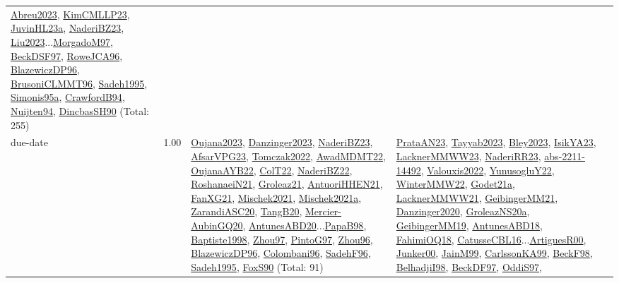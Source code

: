 {\begin{longtable}{p{3cm}r>{\raggedright\arraybackslash}p{6cm}>{\raggedright\arraybackslash}p{6cm}>{\raggedright\arraybackslash}p{8cm}}
\hyperref[detail:Abreu2023]{Abreu2023}, \hyperref[detail:KimCMLLP23]{KimCMLLP23}, \hyperref[detail:JuvinHL23a]{JuvinHL23a}, \hyperref[detail:NaderiBZ23]{NaderiBZ23}, \hyperref[detail:Liu2023]{Liu2023}...\hyperref[detail:MorgadoM97]{MorgadoM97}, \hyperref[detail:BeckDSF97]{BeckDSF97}, \hyperref[detail:RoweJCA96]{RoweJCA96}, \hyperref[detail:BlazewiczDP96]{BlazewiczDP96}, \hyperref[detail:BrusoniCLMMT96]{BrusoniCLMMT96}, \hyperref[detail:Sadeh1995]{Sadeh1995}, \hyperref[detail:Simonis95a]{Simonis95a}, \hyperref[detail:CrawfordB94]{CrawfordB94}, \hyperref[detail:Nuijten94]{Nuijten94}, \hyperref[detail:DincbasSH90]{DincbasSH90} (Total: 255)\\
\index{due-date}\index{Concepts!due-date}due-date &  1.00 & \hyperref[detail:Oujana2023]{Oujana2023}, \hyperref[detail:Danzinger2023]{Danzinger2023}, \hyperref[detail:NaderiBZ23]{NaderiBZ23}, \hyperref[detail:AfsarVPG23]{AfsarVPG23}, \hyperref[detail:Tomczak2022]{Tomczak2022}, \hyperref[detail:AwadMDMT22]{AwadMDMT22}, \hyperref[detail:OujanaAYB22]{OujanaAYB22}, \hyperref[detail:ColT22]{ColT22}, \hyperref[detail:NaderiBZ22]{NaderiBZ22}, \hyperref[detail:RoshanaeiN21]{RoshanaeiN21}, \hyperref[detail:Groleaz21]{Groleaz21}, \hyperref[detail:AntuoriHHEN21]{AntuoriHHEN21}, \hyperref[detail:FanXG21]{FanXG21}, \hyperref[detail:Mischek2021]{Mischek2021}, \hyperref[detail:Mischek2021a]{Mischek2021a}, \hyperref[detail:ZarandiASC20]{ZarandiASC20}, \hyperref[detail:TangB20]{TangB20}, \hyperref[detail:Mercier-AubinGQ20]{Mercier-AubinGQ20}, \hyperref[detail:AntunesABD20]{AntunesABD20}...\hyperref[detail:PapaB98]{PapaB98}, \hyperref[detail:Baptiste1998]{Baptiste1998}, \hyperref[detail:Zhou97]{Zhou97}, \hyperref[detail:PintoG97]{PintoG97}, \hyperref[detail:Zhou96]{Zhou96}, \hyperref[detail:BlazewiczDP96]{BlazewiczDP96}, \hyperref[detail:Colombani96]{Colombani96}, \hyperref[detail:SadehF96]{SadehF96}, \hyperref[detail:Sadeh1995]{Sadeh1995}, \hyperref[detail:FoxS90]{FoxS90} (Total: 91) & \hyperref[detail:PrataAN23]{PrataAN23}, \hyperref[detail:Tayyab2023]{Tayyab2023}, \hyperref[detail:Bley2023]{Bley2023}, \hyperref[detail:IsikYA23]{IsikYA23}, \hyperref[detail:LacknerMMWW23]{LacknerMMWW23}, \hyperref[detail:NaderiRR23]{NaderiRR23}, \hyperref[detail:abs-2211-14492]{abs-2211-14492}, \hyperref[detail:Valouxis2022]{Valouxis2022}, \hyperref[detail:YunusogluY22]{YunusogluY22}, \hyperref[detail:WinterMMW22]{WinterMMW22}, \hyperref[detail:Godet21a]{Godet21a}, \hyperref[detail:LacknerMMWW21]{LacknerMMWW21}, \hyperref[detail:GeibingerMM21]{GeibingerMM21}, \hyperref[detail:Danzinger2020]{Danzinger2020}, \hyperref[detail:GroleazNS20a]{GroleazNS20a}, \hyperref[detail:GeibingerMM19]{GeibingerMM19}, \hyperref[detail:AntunesABD18]{AntunesABD18}, \hyperref[detail:FahimiOQ18]{FahimiOQ18}, \hyperref[detail:CatusseCBL16]{CatusseCBL16}...\hyperref[detail:ArtiguesR00]{ArtiguesR00}, \hyperref[detail:Junker00]{Junker00}, \hyperref[detail:JainM99]{JainM99}, \hyperref[detail:CarlssonKA99]{CarlssonKA99}, \hyperref[detail:BeckF98]{BeckF98}, \hyperref[detail:BelhadjiI98]{BelhadjiI98}, \hyperref[detail:BeckDF97]{BeckDF97}, \hyperref[detail:OddiS97]{OddiS97}, 
\end{longtable}}
